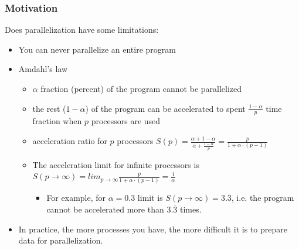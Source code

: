 \documentclass{beamer}
\begin{document}
\begin{frame}
\frametitle{Motivation}
Does parallelization have some limitations:
\begin{itemize}
\item You can never parallelize an entire program
\item Amdahl's law
  \begin{itemize}
  \item $\alpha$ fraction (percent) of the program cannot be parallelized
  \item the rest ($1-\alpha$) of the program can be accelerated to spent $\frac{1 - \alpha}{p}$ time fraction when $p$ processors are used
  \item acceleration ratio for $p$ processors $S(p) = \frac{\alpha + 1 - \alpha}{\alpha + \frac{1-\alpha}{p}} = \frac{p}{1+\alpha \cdot (p-1)}$
  \item The acceleration limit for infinite processors is $S(p\to\infty) = lim_{p\to\infty}\frac{p}{1+\alpha \cdot (p-1)} = \frac{1}{\alpha}$
    \begin{itemize}
    \item For example, for $\alpha=0.3$ limit is $S(p\to\infty) = 3.\overline{3}$, i.e. the program cannot be accelerated more than $3.\overline{3}$ times.
    \end{itemize}
  \end{itemize}
\item In practice, the more processes you have, the more difficult it is to prepare data for parallelization.
\end{itemize}
\end{frame}
\end{document}

